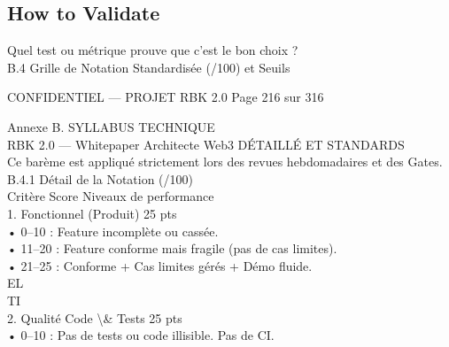 \subsection*{How to Validate}
Quel test ou métrique prouve que c'est le bon choix ?\\
\vspace{0.5em}
\vspace{0.5em}
\vspace{0.5em}
B.4 Grille de Notation Standardisée (/100) et Seuils\\
\vspace{0.5em}
\vspace{0.5em}
\begin{confidential}CONFIDENTIEL — PROJET RBK 2.0                       Page 216 sur 316\end{confidential}
Annexe B. SYLLABUS TECHNIQUE\\
RBK 2.0 — Whitepaper Architecte Web3                                                                         DÉTAILLÉ ET STANDARDS\\
\vspace{0.5em}
\vspace{0.5em}
\vspace{0.5em}
Ce barème est appliqué strictement lors des revues hebdomadaires et des Gates.\\
\vspace{0.5em}
\vspace{0.5em}
B.4.1 Détail de la Notation (/100)\\
\vspace{0.5em}
\vspace{0.5em}
Critère                           Score           Niveaux de performance\\
1. Fonctionnel (Produit)          25 pts\\
• 0–10 : Feature incomplète ou cassée.\\
• 11–20 : Feature conforme mais fragile (pas de cas limites).\\
• 21–25 : Conforme + Cas limites gérés + Démo fluide.\\
\vspace{0.5em}
\vspace{0.5em}
\vspace{0.5em}
\vspace{0.5em}
EL\\
TI\\
2. Qualité Code \textbackslash{}& Tests           25 pts\\
• 0–10 : Pas de tests ou code illisible. Pas de CI.\\
